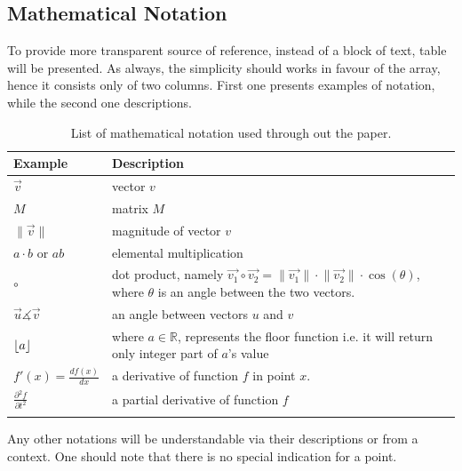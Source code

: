 \documentclass{report}
\DeclarePairedDelimiter\floor{\lfloor}{\rfloor}
\newcommand{\norm}[1]{\lVert#1\rVert}
\begin{document}
\subsection{Mathematical Notation} \label{subsec:math_notation}
To provide more transparent source of reference, instead of a block of text, table will be presented. As always, the simplicity should works in favour of the array, hence it consists only of two columns. First one presents examples of notation, while the second one descriptions.

\begin{longtable}{| p{} | p{} |} 
\hline
Example  & Description \\ \hline
$\vec{v}$& vector $v$ \\ \hline
$M$ & matrix $M$ \\ \hline
 $\norm{\vec{v}}$ & magnitude of vector $v$ \\ \hline
 $a\cdot b$ or $ab$ & elemental multiplication \\ \hline
 $\circ$ & dot product, namely $\vec{v_1} \circ \vec{v_2} = \norm{\vec{v_1}} \cdot \norm{\vec{v_2}} \cdot \cos(\theta)$, where $\theta$ is an angle between the two vectors. \\ \hline
$\vec{u} \measuredangle \vec{v}$ & an angle between vectors $u$ and $v$ \\ \hline

$\floor{a}$ & where $a \in \mathbb{R}$, represents the floor function i.e. it will return only integer part of $a$'s value \\ \hline

$f'(x) = \frac{df(x)}{dx}$ & a derivative of function $f$ in point $x$.\\ \hline
$\frac {\partial{^2f}}{\partial t^2}$ & a partial derivative of function $f$ \\ \hline

\caption{List of mathematical notation used through out the paper.}
\label{tab:product_backlog}
\end{longtable}

Any other notations will be understandable via their descriptions or from a context. One should note that there is no special indication for a point.
\end{document}
